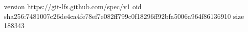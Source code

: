 version https://git-lfs.github.com/spec/v1
oid sha256:7481007c26de4ca4fe78ef7e082ff799c0f18296ff92bfa5006a964f86136910
size 188343
